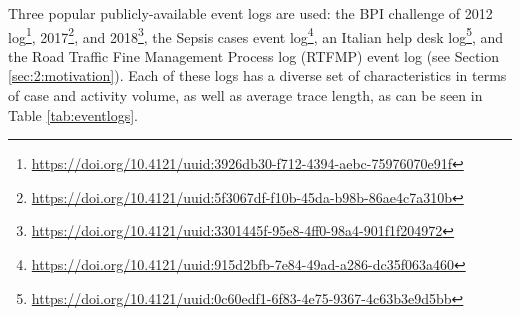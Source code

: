 Three popular publicly-available event logs are used: the BPI challenge of 2012 log\footnote{\url{https://doi.org/10.4121/uuid:3926db30-f712-4394-aebc-75976070e91f}}, 2017\footnote{\url{https://doi.org/10.4121/uuid:5f3067df-f10b-45da-b98b-86ae4c7a310b}}, and 2018\footnote{\url{https://doi.org/10.4121/uuid:3301445f-95e8-4ff0-98a4-901f1f204972}}, the Sepsis cases event log\footnote{\url{https://doi.org/10.4121/uuid:915d2bfb-7e84-49ad-a286-dc35f063a460}}, an Italian help desk log\footnote{\url{https://doi.org/10.4121/uuid:0c60edf1-6f83-4e75-9367-4c63b3e9d5bb}}, and the Road Traffic Fine Management Process log (RTFMP) event log (see Section \ref{sec:2:motivation}).
Each of these logs has a diverse set of characteristics in terms of case and activity volume, as well as average trace length, as can be seen in Table \ref{tab:eventlogs}.
\begin{table}[htbp]
  \centering
  \caption{Overview of the characteristics of the event logs used in the experimental evaluation.}
  \label{tab:eventlogs}%
\end{table}%

